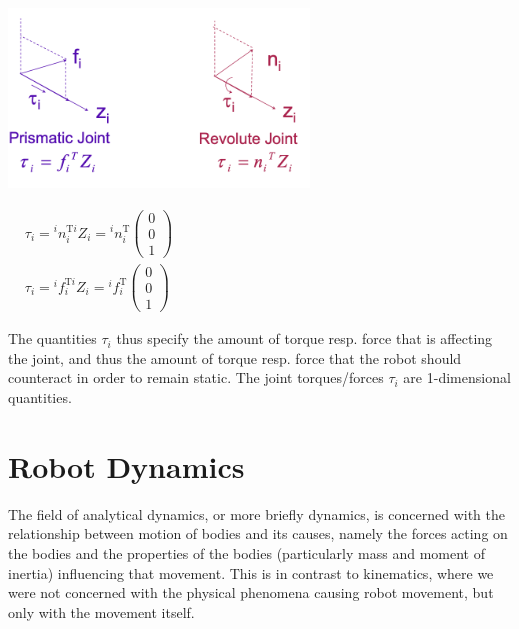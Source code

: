 \begin{minipage}[c]{0.5\textwidth}
	\includegraphics[width=8cm]{sections/imgs/4_prismatic_revolute_torque.png}
\end{minipage}
\hfill
\begin{minipage}[c]{0.5\textwidth}
\begin{center}
$\begin{aligned}
&\tau_{i}={ }^{i} n_{i}^{\mathrm{T} i} Z_{i}={ }^{i} n_{i}^{\mathrm{T}}\left(\begin{array}{l}
0 \\
0 \\
1
\end{array}\right) \\
&\tau_{i}={ }^{i} f_{i}^{\mathrm{T} i} Z_{i}={ }^{i} f_{i}^{\mathrm{T}}\left(\begin{array}{l}
0 \\
0 \\
1
\end{array}\right)
\end{aligned}$
\end{center}

\end{minipage}

The quantities $\tau_i$ thus specify the amount of torque resp. force that is affecting the joint, and thus the amount of torque resp. force that the robot should counteract in order to remain static. The joint torques/forces $\tau_i$ are 1-dimensional quantities.


\newpage
\section{Robot Dynamics}

The field of analytical dynamics, or more briefly dynamics, is concerned with the relationship between motion of bodies and its causes, namely the forces acting on the bodies and the properties of the bodies (particularly mass and moment of inertia) influencing that movement. This is in contrast to kinematics, where we were not concerned with the physical phenomena causing robot movement, but only with the movement itself.

